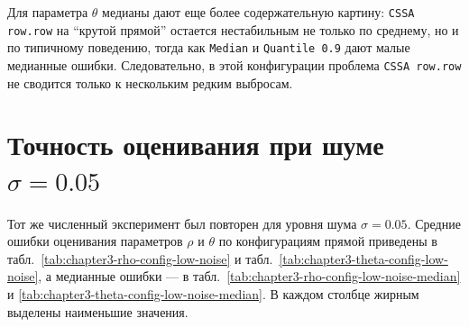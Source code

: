 \begin{table}[H]
	\centering
	\caption{Медианные ошибки оценивания параметра $\theta$ по конфигурациям прямой}
	\label{tab:chapter3-theta-config-median}
\end{table}

Для параметра $\theta$ медианы дают еще более содержательную картину:
\texttt{CSSA row.row} на ``крутой прямой'' остается нестабильным не только по
среднему, но и по типичному поведению, тогда как \texttt{Median} и
\texttt{Quantile 0.9} дают малые медианные ошибки. Следовательно, в этой
конфигурации проблема \texttt{CSSA row.row} не сводится только к нескольким
редким выбросам.

\section{Точность оценивания при шуме $\sigma=0.05$}

Тот же численный эксперимент был повторен для уровня шума $\sigma=0.05$.
Средние ошибки оценивания параметров $\rho$ и $\theta$ по конфигурациям прямой
приведены в табл.~\ref{tab:chapter3-rho-config-low-noise} и
табл.~\ref{tab:chapter3-theta-config-low-noise}, а медианные ошибки ---
в табл.~\ref{tab:chapter3-rho-config-low-noise-median} и
\ref{tab:chapter3-theta-config-low-noise-median}. В каждом столбце жирным
выделены наименьшие значения.

